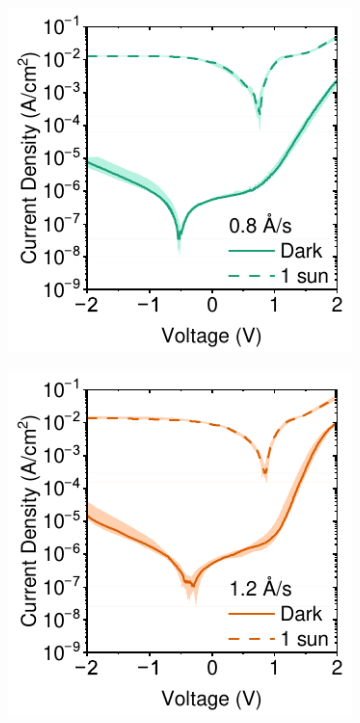 \begin{figure}[htbp]
    \centering
    \begin{subfigure}[t]{0.4\textwidth}
        \centering
        \includegraphics[width=\textwidth]{chapters/material_properties/images/08As-JV.pdf} 
        \caption{}
        \label{fig:ch2:0.8A/s-jv}
    \end{subfigure}
    \hfill
    \begin{subfigure}[t]{0.4\textwidth}
        \centering
        \includegraphics[width=\textwidth]{chapters/material_properties/images/12AS-JV.pdf} %
        \caption{}
        \label{fig:ch2:1.2A/s-vj}
    \end{subfigure}


\end{figure}
